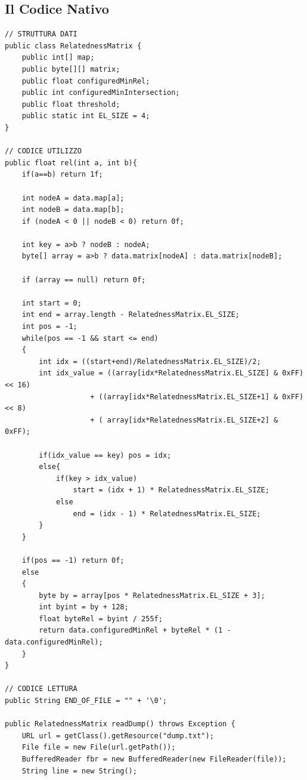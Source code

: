 \subsection{Il Codice Nativo}

\begin{lstlisting}[style=JavaStyle, caption=Implentazione nativa]
// STRUTTURA DATI
public class RelatednessMatrix {
    public int[] map;
    public byte[][] matrix;
    public float configuredMinRel;
    public int configuredMinIntersection;
    public float threshold;
    public static int EL_SIZE = 4;
}

// CODICE UTILIZZO
public float rel(int a, int b){
    if(a==b) return 1f;

    int nodeA = data.map[a];
    int nodeB = data.map[b];
    if (nodeA < 0 || nodeB < 0) return 0f;

    int key = a>b ? nodeB : nodeA;
    byte[] array = a>b ? data.matrix[nodeA] : data.matrix[nodeB];

    if (array == null) return 0f;

    int start = 0;
    int end = array.length - RelatednessMatrix.EL_SIZE;
    int pos = -1;
    while(pos == -1 && start <= end)
    {
        int idx = ((start+end)/RelatednessMatrix.EL_SIZE)/2;
        int idx_value = ((array[idx*RelatednessMatrix.EL_SIZE] & 0xFF) << 16)
                    + ((array[idx*RelatednessMatrix.EL_SIZE+1] & 0xFF) << 8)
                    + ( array[idx*RelatednessMatrix.EL_SIZE+2] & 0xFF);

        if(idx_value == key) pos = idx;
        else{
            if(key > idx_value)
                start = (idx + 1) * RelatednessMatrix.EL_SIZE;
            else
                end = (idx - 1) * RelatednessMatrix.EL_SIZE;
        }
    }

    if(pos == -1) return 0f;
    else
    {
        byte by = array[pos * RelatednessMatrix.EL_SIZE + 3];
        int byint = by + 128;
        float byteRel = byint / 255f;
        return data.configuredMinRel + byteRel * (1 - data.configuredMinRel);
    }
}

// CODICE LETTURA
public String END_OF_FILE = "" + '\0';

public RelatednessMatrix readDump() throws Exception {
    URL url = getClass().getResource("dump.txt");
    File file = new File(url.getPath());
    BufferedReader fbr = new BufferedReader(new FileReader(file));
    String line = new String();


\end{lstlisting}
